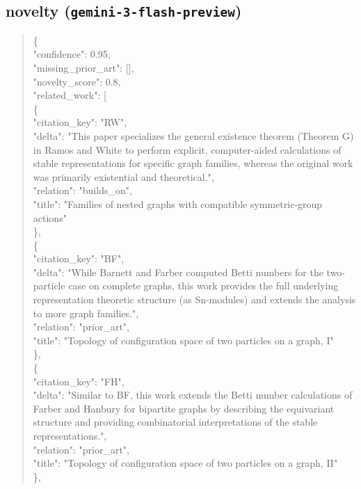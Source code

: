 \documentclass[11pt]{article}
\begin{document}
\subsection*{novelty (\texttt{gemini-3-flash-preview})}
\begin{quote}\small\ttfamily\raggedright
\{\\
  "confidence": 0.95,\\
  "missing\_prior\_art": [],\\
  "novelty\_score": 0.8,\\
  "related\_work": [\\
    \{\\
      "citation\_key": "RW",\\
      "delta": "This paper specializes the general existence theorem (Theorem G) in Ramos and White to perform explicit, computer-aided calculations of stable representations for specific graph families, whereas the original work was primarily existential and theoretical.",\\
      "relation": "builds\_on",\\
      "title": "Families of nested graphs with compatible symmetric-group actions"\\
    \},\\
    \{\\
      "citation\_key": "BF",\\
      "delta": "While Barnett and Farber computed Betti numbers for the two-particle case on complete graphs, this work provides the full underlying representation theoretic structure (as Sn-modules) and extends the analysis to more graph families.",\\
      "relation": "prior\_art",\\
      "title": "Topology of configuration space of two particles on a graph, I"\\
    \},\\
    \{\\
      "citation\_key": "FH",\\
      "delta": "Similar to BF, this work extends the Betti number calculations of Farber and Hanbury for bipartite graphs by describing the equivariant structure and providing combinatorial interpretations of the stable representations.",\\
      "relation": "prior\_art",\\
      "title": "Topology of configuration space of two particles on a graph, II"\\
    \},\\

\end{quote}
\end{document}
